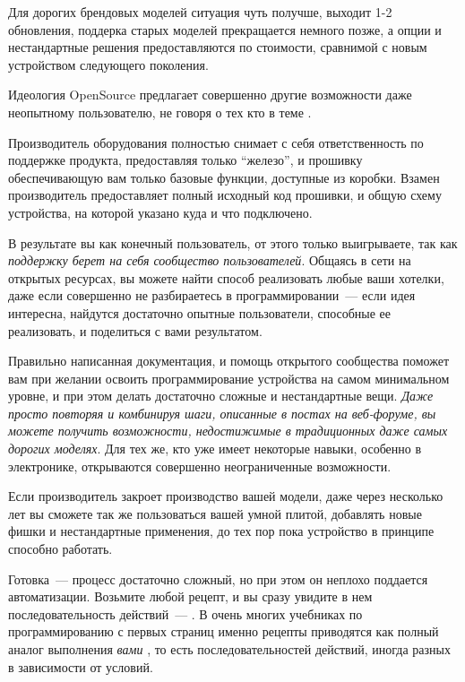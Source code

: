 \noindent
Для дорогих брендовых моделей ситуация чуть получше, выходит 1-2 обновления,
поддерка старых моделей прекращается немного позже, а опции и нестандартные
решения предоставляются по стоимости, сравнимой с новым устройством следующего
поколения.

\clearpage
{}

Идеология OpenSource предлагает совершенно другие возможности даже неопытному
пользователю, не говоря о тех кто в теме .

Производитель оборудования полностью снимает с себя ответственность по поддержке
продукта, предоставляя только ``железо'', и прошивку обеспечивающую вам только
базовые функции, доступные из коробки. Взамен производитель предоставляет полный
исходный код прошивки, и общую схему устройства, на которой указано куда и что
подключено.

В результате вы как конечный пользователь, от этого только выигрываете, так как
\emph{поддержку берет на себя сообщество пользователей}. Общаясь в сети на
открытых ресурсах, вы можете найти
способ реализовать любые ваши хотелки, даже если совершенно не разбираетесь в
программировании\ --- если идея интересна, найдутся достаточно опытные
пользователи, способные ее реализовать, и поделиться с вами результатом.

Правильно написанная документация, и помощь открытого сообщества поможет вам при
желании освоить программирование устройства на самом минимальном уровне, и при
этом делать достаточно сложные и нестандартные вещи. \emph{Даже просто повторяя
и комбинируя шаги, описанные в постах на веб-форуме, вы можете получить
возможности, недостижимые в традиционных даже самых дорогих моделях}. Для тех
же, кто уже имеет некоторые навыки, особенно в электронике, открываются
совершенно неограниченные возможности.

Если производитель закроет производство вашей модели, даже через несколько лет
вы сможете так же пользоваться вашей умной плитой, добавлять новые фишки и
нестандартные применения, до тех пор пока устройство в принципе способно
работать.

\clearpage
{}

Готовка\ --- процесс достаточно сложный, но при этом он неплохо поддается
автоматизации. Возьмите любой рецепт, и вы сразу увидите в нем
последовательность действий\ --- . В очень многих
учебниках по программированию с первых страниц именно рецепты приводятся как
полный аналог выполнения \textit{вами} , то есть
последовательностей действий, иногда разных в зависимости от условий.

